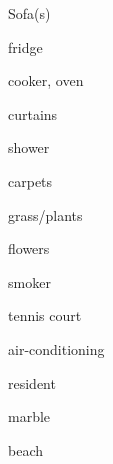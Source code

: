 \documentclass[avery5371,grid,frame]{flashcards}
\begin{document}
\begin{flashcard}{\LARGE Sofa(s)}
\LARGE {}
\end{flashcard}
\begin{flashcard}{\LARGE fridge}
\LARGE {}
\end{flashcard}
\begin{flashcard}{\LARGE cooker, oven}
\LARGE {}
\end{flashcard}
\begin{flashcard}{\LARGE curtains}
\LARGE {}
\end{flashcard}
\begin{flashcard}{\LARGE shower}
\LARGE {}
\end{flashcard}
\begin{flashcard}{\LARGE carpets}
\LARGE {}
\end{flashcard}
\begin{flashcard}{\LARGE grass/plants}
\LARGE {}
\end{flashcard}
\begin{flashcard}{\LARGE flowers}
\LARGE {}
\end{flashcard}
\begin{flashcard}{\LARGE smoker}
\LARGE {}
\end{flashcard}
\begin{flashcard}{\LARGE tennis court}
\LARGE {}
\end{flashcard}
\begin{flashcard}{\LARGE air-conditioning}
\LARGE {}
\end{flashcard}
\begin{flashcard}{\LARGE resident}
\LARGE {}
\end{flashcard}
\begin{flashcard}{\LARGE marble}
\LARGE {}
\end{flashcard}
\begin{flashcard}{\LARGE beach}
\LARGE {}
\end{flashcard}
\end{document}

